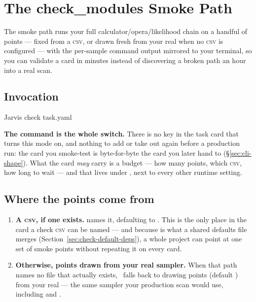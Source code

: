 \chapter{The check\_modules Smoke Path}
\label{ch:check-modules}

 The smoke path runs your full
calculator/opera/likelihood chain on a handful of points --- fixed from a \textsc{csv},
or drawn fresh from your real  when no \textsc{csv} is
configured --- with the per-sample command output mirrored to your terminal, so you can
validate a card in minutes instead of discovering a broken  path an hour
into a real scan.

\section{Invocation}
\label{sec:check-invocation}

\begin{terminal}
\begin{jcmd}
Jarvis check task.yaml
\end{jcmd}
\end{terminal}

\textbf{The command is the whole switch.} There is no key in the task card that turns
this mode on, and nothing to add or take out again before a production run: the card you
smoke-test is byte-for-byte the card you later hand to 
(\S\ref{sec:cli-shape}). What the card \emph{may} carry is a budget --- how many points,
which \textsc{csv}, how long to wait --- and that lives under , next
to every other runtime setting.

\section{Where the points come from}
\label{sec:check-points-source}

\begin{enumerate}
  \item \textbf{A \textsc{csv}, if one exists.} 
        names it, defaulting to
        . This is the
        only place in the card a check \textsc{csv} can be named --- and because
         is what a shared defaults file merges
        (Section~\ref{sec:check-default-deps}), a whole project can point at one set of
        smoke points without repeating it on every card.
  \item \textbf{Otherwise, points drawn from your real sampler.} When that path names
        no file that actually exists, \Jtwo\ falls back to drawing
         points (default ) from
        your real  --- the same sampler your production scan
        would use, including  and .
\end{enumerate}

